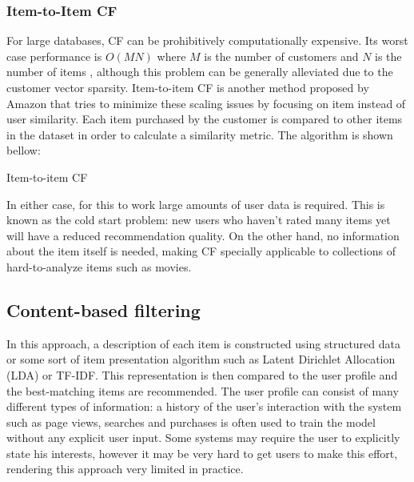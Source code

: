 \documentclass[cic,tc,english]{iiufrgs}
\begin{document}
\subsubsection{Item-to-Item CF}
For large databases, CF can be prohibitively computationally expensive. Its worst case performance is \(O(MN)\) where \(M\) is the number of customers and \(N\) is the number of items \cite{Linden2003}, although this problem can be generally alleviated due to the customer vector sparsity. Item-to-item CF is another method proposed by Amazon that tries to minimize these scaling issues by focusing on item instead of user similarity. Each item purchased by the customer is compared to other items in the dataset in order to calculate a similarity metric. The algorithm is shown bellow:

\begin{algorithm}[H]
 \caption{Item-to-item CF}
\end{algorithm}

In either case, for this to work large amounts of user data is required. This is known as the cold start problem: new users who haven't rated many items yet will have a reduced recommendation quality. On the other hand, no information about the item itself is needed, making CF specially applicable to collections of hard-to-analyze items such as movies.

\subsection{Content-based filtering}
In this approach, a description of each item is constructed using structured data or some sort of item presentation algorithm such as Latent Dirichlet Allocation (LDA) or TF-IDF. This representation is then compared to the user profile and the best-matching items are recommended. The user profile can consist of many different types of information: a history of the user's interaction with the system such as page views, searches and purchases is often used to train the model without any explicit user input. Some systems may require the user to explicitly state his interests, however it may be very hard to get users to make this effort, rendering this approach very limited in practice.
\end{document}
